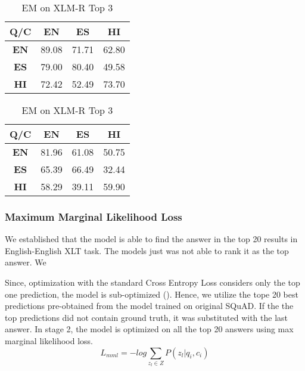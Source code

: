 \documentclass[12pt]{article}   %
\begin{document}
 \begin{table}[H]
        \begin{minipage}{0.5\textwidth}
            \centering
		\begin{tabular}{|c|c|c|c|}
			\hline
 			\textbf{Q/C} &  \textbf{EN} &  \textbf{ES} &  \textbf{HI} \\
			\hline
			 \textbf{EN} & 89.08 & 71.71 & 62.80 \\
			\hline
			\textbf{ES} & 79.00 &  80.40 & 49.58 \\
			\hline
			\textbf{HI} & 72.42 & 52.49 & 73.70 \\
			\hline
		\end{tabular}
		\caption{F1 on XLM-R Top 3}
	\end{minipage}%
        \hfill
	\begin{minipage}{0.5\textwidth}
         	\centering
			\begin{tabular}{|c|c|c|c|}
				\hline
				 \textbf{Q/C} &  \textbf{EN} &  \textbf{ES} &  \textbf{HI} \\
				\hline
				\textbf{EN} & 81.96 & 61.08 & 50.75 \\
				 \hline
				\textbf{ES} & 65.39 & 66.49 & 32.44 \\
				\hline
				 \textbf{HI} & 58.29 & 39.11 & 59.90\\
				 \hline
			\end{tabular}
			\caption{EM on XLM-R Top 3}
	\end{minipage}%
\end{table}

\subsubsection{Maximum Marginal Likelihood Loss}
We established that the model is able to find the answer in the top 20 results in English-English XLT task. The models just was not able to rank it as the top answer. We 

Since, optimization with the standard Cross Entropy Loss considers only the top one prediction, the model is sub-optimized (\cite{Chen_Shou_Gong_Pei_2022}). Hence, we utilize the tope 20 best predictions pre-obtained from the model trained on original SQuAD. If the the top predictions did not contain ground truth, it was substituted with the last answer. In stage 2, the model is optimized on all the top 20 answers using max marginal likelihood loss.
\begin{equation} \label{mml}
	L_{mml} = -log \sum_{z_{l}\in Z}P(z_{l}|q_{i}, c_{i})
\end{equation}
\end{document}
